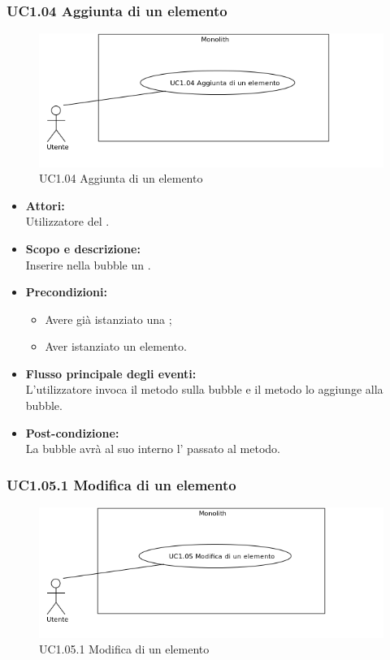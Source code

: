 \subsubsection{UC1.04 Aggiunta di un elemento} \label{UC1.04}

\begin{figure}[H]
	\centering
	\includegraphics[width=15cm]{../../documenti/AnalisiDeiRequisiti/Diagrammi_img/uc1_04.png}
	\caption{UC1.04 Aggiunta di un elemento}
\end{figure}

\begin{itemize}
	\item \textbf{Attori:}
	\\Utilizzatore del .
	\item \textbf{Scopo e descrizione:} 
	\\Inserire nella bubble un .
	\item \textbf{Precondizioni:}
	\begin{itemize}
		\item Avere già istanziato una ;
		\item Aver istanziato un elemento.
	\end{itemize}
	\item \textbf{Flusso principale degli eventi:}
	\\L’utilizzatore invoca il metodo sulla bubble e il metodo lo aggiunge alla bubble.
	\item \textbf{Post-condizione:}
	\\La bubble avrà al suo interno l' passato al metodo.
\end{itemize}

\subsubsection{UC1.05.1 Modifica di un elemento} \label{UC1.05.1}

\begin{figure}[H]
	\centering
	\includegraphics[width=15cm]{../../documenti/AnalisiDeiRequisiti/Diagrammi_img/uc1_05.png}
	\caption{UC1.05.1 Modifica di un elemento}
\end{figure}

